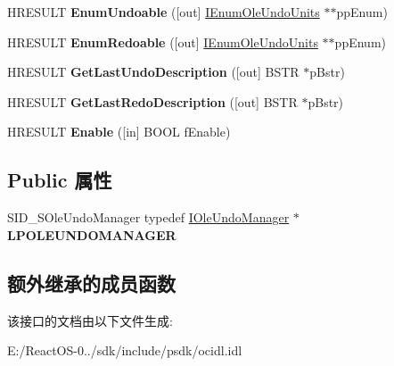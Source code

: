 \begin{DoxyCompactItemize}
\item 
\mbox{\label{interface_i_ole_undo_manager_a7556e9d35d6f78d6b6d52b0c84a01507}} 
H\+R\+E\+S\+U\+LT {\bfseries Enum\+Undoable} (\mbox{[}out\mbox{]} \hyperlink{interface_i_enum_ole_undo_units}{I\+Enum\+Ole\+Undo\+Units} $\ast$$\ast$pp\+Enum)
\item 
\mbox{\label{interface_i_ole_undo_manager_a4f7d5ecb57b9e23d2e6b4ef1037a30da}} 
H\+R\+E\+S\+U\+LT {\bfseries Enum\+Redoable} (\mbox{[}out\mbox{]} \hyperlink{interface_i_enum_ole_undo_units}{I\+Enum\+Ole\+Undo\+Units} $\ast$$\ast$pp\+Enum)
\item 
\mbox{\label{interface_i_ole_undo_manager_a9f22b8d5ee0e0f98d059bd6188cedac6}} 
H\+R\+E\+S\+U\+LT {\bfseries Get\+Last\+Undo\+Description} (\mbox{[}out\mbox{]} B\+S\+TR $\ast$p\+Bstr)
\item 
\mbox{\label{interface_i_ole_undo_manager_a772e0b87af62dad45bcbc53da27f84ee}} 
H\+R\+E\+S\+U\+LT {\bfseries Get\+Last\+Redo\+Description} (\mbox{[}out\mbox{]} B\+S\+TR $\ast$p\+Bstr)
\item 
\mbox{\label{interface_i_ole_undo_manager_aac9a24cf414fd31cb1fe56d1483e8031}} 
H\+R\+E\+S\+U\+LT {\bfseries Enable} (\mbox{[}in\mbox{]} B\+O\+OL f\+Enable)
\end{DoxyCompactItemize}
\subsection*{Public 属性}
\begin{DoxyCompactItemize}
\item 
\mbox{\label{interface_i_ole_undo_manager_a6781385ea4ebf7edf26c43542a38b350}} 
S\+I\+D\+\_\+\+S\+Ole\+Undo\+Manager typedef \hyperlink{interface_i_ole_undo_manager}{I\+Ole\+Undo\+Manager} $\ast$ {\bfseries L\+P\+O\+L\+E\+U\+N\+D\+O\+M\+A\+N\+A\+G\+ER}
\end{DoxyCompactItemize}
\subsection*{额外继承的成员函数}


该接口的文档由以下文件生成\+:\begin{DoxyCompactItemize}
\item 
E\+:/\+React\+O\+S-\/0../sdk/include/psdk/ocidl.\+idl\end{DoxyCompactItemize}
